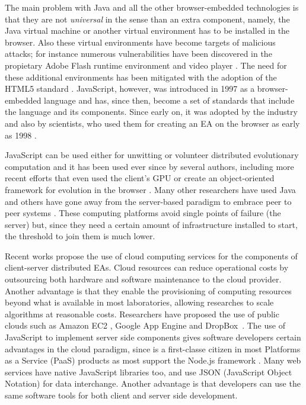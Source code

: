\documentclass[journal,onecolumn]{IEEEtran}
\begin{document}
The main problem with Java and all the other browser-embedded
technologies is that they are not {\em universal} in the
sense than an extra component, namely, the Java virtual machine or another
virtual environment has to be installed in the browser. 
Also these virtual environments have become targets of malicious attacks; %
for instance numerous vulnerabilities have been discovered in %
the propietary Adobe Flash runtime environment and 
video player \cite{ford2009analyzing,watanabe2010new}. The need for
these additional environments has been mitigated with the 
adoption of the HTML5 standard \cite{anthes2012html5}.
JavaScript, however,
\cite{flanagan2006javascript} was introduced in 1997 as a
browser-embedded language and has, since then, become a set of standards
\cite{ECMA-262} that include the language and its components. Since
early on, it was adopted by the industry and also by scientists,
who used them for creating an EA on
the browser as early as 1998 \cite{jj-ppsn98}. 

JavaScript can be used either for unwitting
\cite{unwitting-ec} or volunteer
\cite{langdon:2005:metas,gecco07:workshop:dcor} distributed
evolutionary computation and it has been used ever since by several
authors, including more recent efforts
\cite{Desell:2008:AHG:1389095.1389273,duda2013distributed,DBLP:journals/corr/abs-0801-1210}
that even 
used the client's GPU \cite{duda2013gpu} or create an object-oriented
framework for evolution in the browser \cite{EvoStar2014:jsEO}. Many other researchers have
used Java \cite{chong:1999:jDGPi} and others have gone away from the
server-based paradigm to embrace peer to peer systems
\cite{jin2006constructing,10.1109/ICICSE.2008.99,DBLP:conf/3pgcic/GuervosMFEL12}. These computing
platforms avoid single points of failure (the server) but, since they
need a certain amount of infrastructure installed to start, the
threshold to join them is much lower. 

Recent works propose the use of cloud computing services for the components of 
client-server distributed EAs. Cloud resources 
can reduce operational costs by outsourcing both hardware and software maintenance 
to the cloud provider. Another advantage is that they enable the provisioning of computing resources beyond what 
is available in most laboratories, allowing researches to 
scale algorithms at reasonable costs. Researchers have proposed the use of 
public clouds such as Amazon EC2 \cite{CloudScale}, Google App Engine\cite{di2013towards} 
and DropBox~\cite{mericloud}. The use of JavaScript to implement
server side components 
gives software developers certain advantages in the cloud
paradigm, since is a first-classe citizen 
in most Platforms as a Service (PaaS) products as most support the Node.js
framework \cite{wood13:nodejs:paas}. Many web services  
have native JavaScript libraries too, and use JSON (JavaScript Object Notation) for data
interchange. Another advantage is that  
developers can use the same software tools for both client and server
side development.
\end{document}
